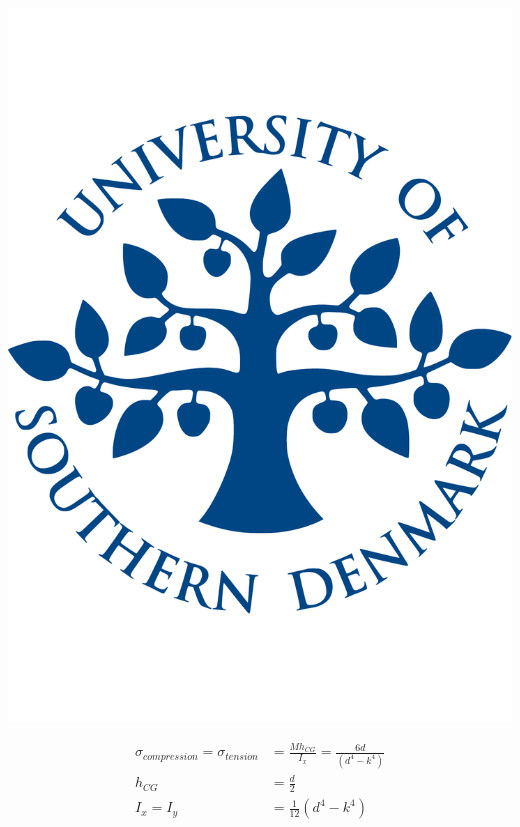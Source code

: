   \noindent\begin{minipage}{0.2\textwidth}%
      \includegraphics[width=\linewidth]{figures/sdu_logo.pdf}
  \end{minipage}%
  \hfill%
  \begin{minipage}{0.8\textwidth}
    \begin{equation}
    \begin{align*}
      \sigma _{compression} = \sigma _{tension} &= \frac{M h_{CG}}{I_x} = \frac{6 d}{(d^4 - k^4)}\\
      h_{CG} &= \frac{d}{2} \\
      I_x = I_y &= \frac{1}{12} (d^4 - k^4)
      \end{align*}
    \end{equation}
  \end{minipage}






